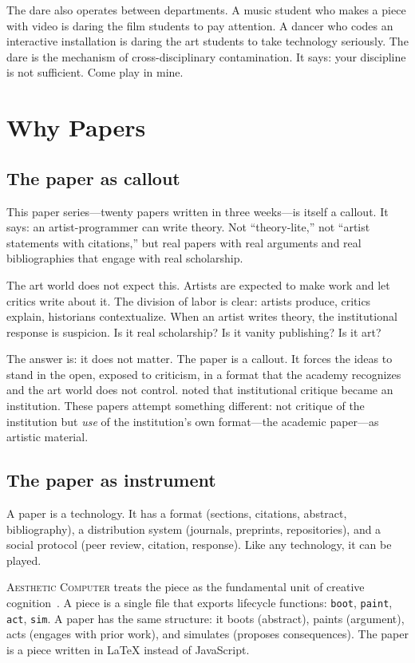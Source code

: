\documentclass[10pt,letterpaper,twocolumn]{article}
\newcommand{\ac}{\textsc{Aesthetic Computer}}
\begin{document}
The dare also operates between departments. A music student who makes a piece with video is daring the film students to pay attention. A dancer who codes an interactive installation is daring the art students to take technology seriously. The dare is the mechanism of cross-disciplinary contamination. It says: your discipline is not sufficient. Come play in mine.

\section{Why Papers}

\subsection{The paper as callout}

This paper series---twenty papers written in three weeks---is itself a callout. It says: an artist-programmer can write theory. Not ``theory-lite,'' not ``artist statements with citations,'' but real papers with real arguments and real bibliographies that engage with real scholarship.

The art world does not expect this. Artists are expected to make work and let critics write about it. The division of labor is clear: artists produce, critics explain, historians contextualize. When an artist writes theory, the institutional response is suspicion. Is it real scholarship? Is it vanity publishing? Is it art?

The answer is: it does not matter. The paper is a callout. It forces the ideas to stand in the open, exposed to criticism, in a format that the academy recognizes and the art world does not control. \citet{fraser2005critique} noted that institutional critique became an institution. These papers attempt something different: not critique of the institution but \emph{use} of the institution's own format---the academic paper---as artistic material.

\subsection{The paper as instrument}

A paper is a technology. It has a format (sections, citations, abstract, bibliography), a distribution system (journals, preprints, repositories), and a social protocol (peer review, citation, response). Like any technology, it can be played.

\ac{} treats the piece as the fundamental unit of creative cognition~\citep{scudder2026pieces}. A piece is a single file that exports lifecycle functions: \texttt{boot}, \texttt{paint}, \texttt{act}, \texttt{sim}. A paper has the same structure: it boots (abstract), paints (argument), acts (engages with prior work), and simulates (proposes consequences). The paper is a piece written in \LaTeX{} instead of JavaScript.
\end{document}
